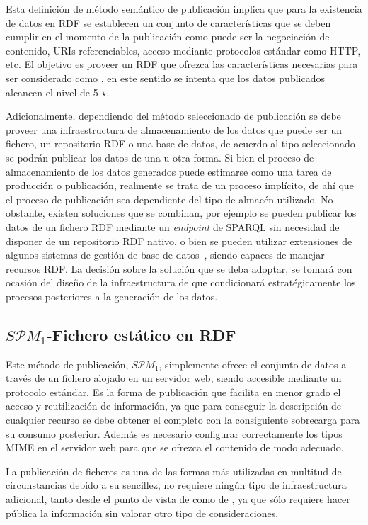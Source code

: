Esta definición de método semántico de publicación implica que para la existencia de datos en \gls{RDF} 
se establecen un conjunto de características que se deben cumplir en el momento de la publicación como
puede ser la negociación de contenido, \gls{URI}s referenciables, acceso mediante protocolos estándar como \gls{HTTP}, etc. El objetivo es proveer
un \dataset RDF que ofrezca las características necesarias para ser considerado
como \linkeddata, en este sentido se intenta que los datos publicados alcancen el nivel de 5 $\star$.

Adicionalmente, dependiendo del método seleccionado de publicación se debe proveer una infraestructura
de almacenamiento de los datos que puede ser un fichero, un repositorio RDF o una base de datos, de acuerdo al 
tipo seleccionado se podrán publicar los datos de una u otra forma. Si bien el proceso de almacenamiento de los 
datos generados puede estimarse como una tarea de producción o publicación, realmente se trata
de un proceso implícito, de ahí que el proceso de publicación sea dependiente del tipo de almacén 
utilizado. No obstante, existen soluciones que se combinan, por ejemplo se pueden publicar los datos
de un fichero RDF mediante un \textit{endpoint} de \gls{SPARQL} sin necesidad de disponer de un repositorio
RDF nativo, o bien se pueden utilizar extensiones de algunos sistemas de gestión de base de datos~\cite{oracle-rdf}, siendo 
capaces de manejar recursos RDF. La decisión sobre la solución que se deba adoptar, se tomará con ocasión 
del diseño de la infraestructura de \linkeddata que condicionará estratégicamente los procesos posteriores a la generación de los datos.

\subsection{$S\mathcal{P}M_{1}$-Fichero estático en RDF}\label{spm-1-pub}
Este método de publicación, $S\mathcal{P}M_{1}$, simplemente ofrece el conjunto de datos
a través de un fichero alojado en un servidor web, siendo accesible mediante un protocolo estándar.
Es la forma de publicación que facilita en menor grado el acceso y reutilización de información, 
ya que para conseguir la descripción de cualquier recurso se debe obtener el \dataset completo 
con la consiguiente sobrecarga para su consumo posterior. Además es necesario configurar correctamente los 
tipos \gls{MIME} en el servidor web para que se ofrezca el contenido de modo adecuado.

La publicación de ficheros es una de las formas más utilizadas en multitud de circunstancias debido a su
sencillez, no requiere ningún tipo de infraestructura adicional, tanto desde el punto de vista de \opendata como de \linkeddata, ya que sólo requiere
hacer pública la información sin valorar otro tipo de consideraciones.


